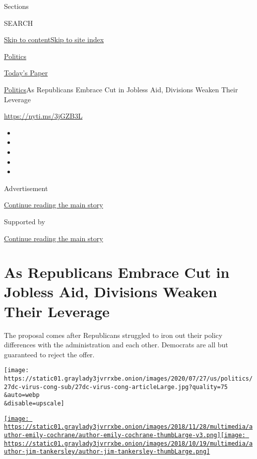 Sections

SEARCH

\protect\hyperlink{site-content}{Skip to
content}\protect\hyperlink{site-index}{Skip to site index}

\href{https://www.nytimes3xbfgragh.onion/section/politics}{Politics}

\href{https://myaccount.nytimes3xbfgragh.onion/auth/login?response_type=cookie\&client_id=vi}{}

\href{https://www.nytimes3xbfgragh.onion/section/todayspaper}{Today's
Paper}

\href{/section/politics}{Politics}\textbar{}As Republicans Embrace Cut
in Jobless Aid, Divisions Weaken Their Leverage

\url{https://nyti.ms/3jGZB3L}

\begin{itemize}
\item
\item
\item
\item
\item
\end{itemize}

Advertisement

\protect\hyperlink{after-top}{Continue reading the main story}

Supported by

\protect\hyperlink{after-sponsor}{Continue reading the main story}

\hypertarget{as-republicans-embrace-cut-in-jobless-aid-divisions-weaken-their-leverage}{%
\section{As Republicans Embrace Cut in Jobless Aid, Divisions Weaken
Their
Leverage}\label{as-republicans-embrace-cut-in-jobless-aid-divisions-weaken-their-leverage}}

The proposal comes after Republicans struggled to iron out their policy
differences with the administration and each other. Democrats are all
but guaranteed to reject the offer.

\texttt{[image: https://static01.graylady3jvrrxbe.onion/images/2020/07/27/us/politics/27dc-virus-cong-sub/27dc-virus-cong-articleLarge.jpg?quality=75\\\&auto=webp\\\&disable=upscale]}

\href{https://www.nytimes3xbfgragh.onion/by/emily-cochrane}{\texttt{[image: https://static01.graylady3jvrrxbe.onion/images/2018/11/28/multimedia/author-emily-cochrane/author-emily-cochrane-thumbLarge-v3.png]}}\href{https://www.nytimes3xbfgragh.onion/by/jim-tankersley}{\texttt{[image: https://static01.graylady3jvrrxbe.onion/images/2018/10/19/multimedia/author-jim-tankersley/author-jim-tankersley-thumbLarge.png]}}

